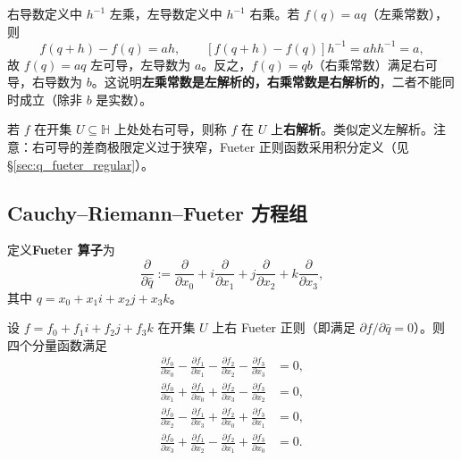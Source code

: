 \begin{remark}[左右导数的本质区别]\label{rem:q_derivative_difference}
右导数定义中 $h^{-1}$ 左乘，左导数定义中 $h^{-1}$ 右乘。若 $f(q)=aq$（左乘常数），则
\[
f(q+h)-f(q)=a h,\qquad [f(q+h)-f(q)]h^{-1}=a h h^{-1}=a,
\]
故 $f(q)=aq$ 左可导，左导数为 $a$。反之，$f(q)=qb$（右乘常数）满足右可导，右导数为 $b$。这说明\textbf{左乘常数是左解析的，右乘常数是右解析的}，二者不能同时成立（除非 $b$ 是实数）。
\end{remark}

\begin{definition}[四元数解析函数]\label{def:q_analytic}
若 $f$ 在开集 $U\subseteq\mathbb{H}$ 上处处右可导，则称 $f$ 在 $U$ 上\textbf{右解析}。类似定义左解析。注意：右可导的差商极限定义过于狭窄，Fueter 正则函数采用积分定义（见 \S\ref{sec:q_fueter_regular}）。
\end{definition}

\subsection{Cauchy--Riemann--Fueter 方程组}

\begin{definition}[Fueter 算子]\label{def:q_fueter_operator}
定义\textbf{Fueter 算子}为
\[
\frac{\partial}{\partial \bar q}:=
\frac{\partial}{\partial x_0}
+i\frac{\partial}{\partial x_1}
+j\frac{\partial}{\partial x_2}
+k\frac{\partial}{\partial x_3},
\]
其中 $q=x_0+x_1i+x_2j+x_3k$。
\end{definition}

\begin{theorem}\label{thm:q_crf}
设 $f=f_0+f_1i+f_2j+f_3k$ 在开集 $U$ 上右 Fueter 正则（即满足 $\partial f/\partial \bar q=0$）。则四个分量函数满足
\[
\begin{aligned}
\frac{\partial f_0}{\partial x_0}
-\frac{\partial f_1}{\partial x_1}
-\frac{\partial f_2}{\partial x_2}
-\frac{\partial f_3}{\partial x_3}&=0,\\[2pt]
\frac{\partial f_0}{\partial x_1}
+\frac{\partial f_1}{\partial x_0}
+\frac{\partial f_2}{\partial x_3}
-\frac{\partial f_3}{\partial x_2}&=0,\\[2pt]
\frac{\partial f_0}{\partial x_2}
-\frac{\partial f_1}{\partial x_3}
+\frac{\partial f_2}{\partial x_0}
+\frac{\partial f_3}{\partial x_1}&=0,\\[2pt]
\frac{\partial f_0}{\partial x_3}
+\frac{\partial f_1}{\partial x_2}
-\frac{\partial f_2}{\partial x_1}
+\frac{\partial f_3}{\partial x_0}&=0.
\end{aligned}
\]
\end{theorem}

